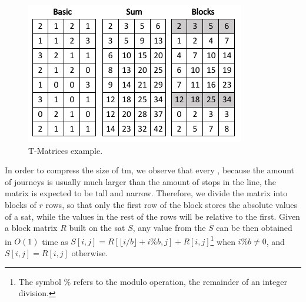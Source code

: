     \begin{figure}[ht]
    \begin{center}
      \includegraphics[scale=0.8]{figures/Tmatrices.png}
      \caption{T-Matrices example.}
      \label{fig:tmatrix}
    \end{center}
    \end{figure}
    
    
    
    In order to compress the size of \gls{tm}, we observe that every \tm, because the amount of journeys is usually much larger than the amount of stops in the line, the matrix is expected to be tall and narrow. Therefore, we divide the matrix into blocks of $r$ rows, so that only the first row of the block stores the absolute values of a \gls{sat}, while the values in the rest of the rows will be relative to the first. Given a block matrix $R$ built on the \gls{sat} $S$, any value from the $S$ can be then obtained in $O(1)$ time as $S[i,j] = R[\lfloor i/b \rfloor + i\%b,j] + R[i,j]$\footnote{The symbol $\%$ refers to the modulo operation, the remainder of an integer division.} when $i\%b \neq 0$, and $S[i,j] = R[i,j]$ otherwise.

